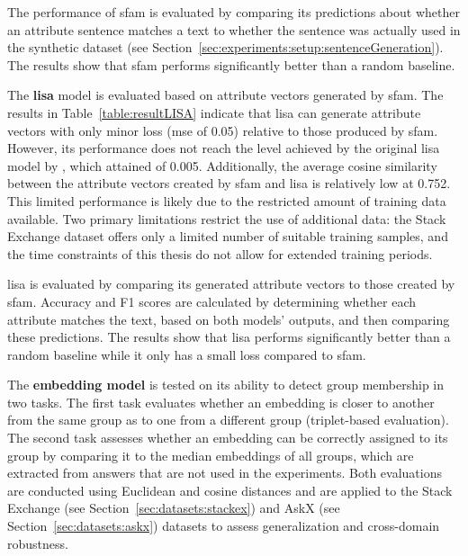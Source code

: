 \begin{table}[ht]
  \caption[]{The performance of \ac{sfam} is evaluated by comparing its predictions about whether an attribute sentence matches a text to whether the sentence was actually used in the synthetic dataset (see Section~\ref{sec:experiments:setup:sentenceGeneration}). The results show that \ac{sfam} performs significantly better than a random baseline.}%
  \label{table:resultSFAM}
  \centering
  \resultSfam{}
\end{table}

The \textbf{\acs{lisa}} model is evaluated based on attribute vectors generated by \ac{sfam}. The results in Table~\ref{table:resultLISA} indicate that \ac{lisa} can generate attribute vectors with only minor loss (\acs{mse} of \num{0.05}) relative to those produced by \ac{sfam}. However, its performance does not reach the level achieved by the original \ac{lisa} model by \citet{patelLearningInterpretableStyle2023}, which attained  of \num{0.005}. Additionally, the average cosine similarity between the attribute vectors created by \ac{sfam} and \ac{lisa} is relatively low at \num{0.752}. This limited performance is likely due to the restricted amount of training data available. Two primary limitations restrict the use of additional data: the Stack Exchange dataset offers only a limited number of suitable training samples, and the time constraints of this thesis do not allow for extended training periods.

\begin{table}[ht]
  \caption[]{\ac{lisa} is evaluated by comparing its generated attribute vectors to those created by \ac{sfam}. Accuracy and F1 scores are calculated by determining whether each attribute matches the text, based on both models' outputs, and then comparing these predictions. The results show that \ac{lisa} performs significantly better than a random baseline while it only has a small loss compared to \ac{sfam}.}%
  \label{table:resultLISA}
  \centering
  \resultLisa{}
\end{table}

The \textbf{embedding model} is tested on its ability to detect group membership in two tasks. The first task evaluates whether an embedding is closer to another from the same group as to one from a different group (triplet-based evaluation). The second task assesses whether an embedding can be correctly assigned to its group by comparing it to the median embeddings of all groups, which are extracted from answers that are not used in the experiments. Both evaluations are conducted using Euclidean and cosine distances and are applied to the Stack Exchange (see Section~\ref{sec:datasets:stackex}) and AskX (see Section~\ref{sec:datasets:askx}) datasets to assess generalization and cross-domain robustness.

